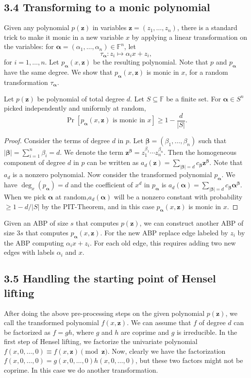 \subsection*{3.4 Transforming to a monic polynomial}
Given any polynomial $p(\mathbf z)$ in variables $\mathbf z=(z_1,\ldots,z_n)$, there is a standard trick to make it monic in a new variable $x$ by applying a linear transformation on the variables: for $\boldsymbol\alpha=(\alpha_1,\ldots,\alpha_n)\in\mathbb F^n$, let
\[\tau_{\boldsymbol\alpha}:z_i\mapsto\alpha_ix+z_i,\]
for $i=1,\ldots,n$. Let $p_{\boldsymbol\alpha}(x,\mathbf z)$ be the resulting polynomial. Note that $p$ and $p_{\boldsymbol\alpha}$ have the same degree. We show that $p_{\boldsymbol\alpha}(x,\mathbf z)$ is monic in $x$, for a random transformation $\tau_{\boldsymbol\alpha}$.
\begin{ntlemma}
Let $p(\mathbf z)$ be polynomial of total degree $d$. Let $S\subseteq\mathbb F$ be a finite set. For $\boldsymbol\alpha\in S^n$ picked independently and uniformly at random,
\[\Pr[p_{\boldsymbol\alpha}(x,\mathbf z)\text{ is monic in }x]\geq1-\frac d{|S|}.\]
\end{ntlemma}
\begin{proof}
Consider the terms of degree $d$ in $p$. Let $\boldsymbol\beta=(\beta_1,\ldots,\beta_n)$ such that $|\boldsymbol\beta|=\sum_{i=1}^n\beta_i=d$. We denote the term $\mathbf z^{\boldsymbol\beta}=z_1^{\beta_1}\cdots z_n^{\beta_n}$. Then the homogeneous component of degree $d$ in $p$ can be written as $a_d(\mathbf z)=\sum_{|\boldsymbol\beta|=d}c_{\boldsymbol\beta}\mathbf z^{\boldsymbol\beta}$. Note that $a_d$ is a nonzero polynomial.
Now consider the transformed polynomial $p_{\boldsymbol\alpha}$. We have $\deg_x(p_{\boldsymbol\alpha})=d$ and the coefficient of $x^d$ in $p_{\boldsymbol\alpha}$ is $a_d(\boldsymbol\alpha)=\sum_{|\boldsymbol\beta|=d}c_{\boldsymbol\beta}\boldsymbol\alpha^{\boldsymbol\beta}$. When we pick $\boldsymbol\alpha$ at random,$a_d(\boldsymbol\alpha)$ will be a nonzero constant with probability $\geq1-d/|S|$ by the PIT-Theorem, and in this case $p_{\boldsymbol\alpha}(x,\mathbf z)$ is monic in $x$.
\end{proof}
Given an ABP of size $s$ that computes $p(\mathbf z)$, we can construct another ABP of size $3s$ that computes $p_{\boldsymbol\alpha}(x,\mathbf z)$. For the new ABP replace edge labeled by $z_i$ by the ABP computing $\alpha_ix+z_i$. For each old edge, this requires adding two new edges with labels $\alpha_i$ and $x$.
\subsection*{3.5 Handling the starting point of Hensel lifting}
After doing the above pre-processing steps on the given polynomial $p(\mathbf z)$, we call the transformed polynomial $f(x,\mathbf z)$. We can assume that $f$ of degree $d$ can be factorized as $f=gh$, where $g$ and $h$ are coprime and $g$ is irreducible. In the first step of Hensel lifting, we factorize the univariate polynomial $f(x,0,\ldots,0)\equiv f(x,\mathbf z)\pmod{\mathbf z}$. Now, clearly we have the factorization $f(x,0,\ldots,0)=g(x,0,\ldots,0)h(x,0,\ldots,0)$, but these two factors might not be coprime. In this case we do another transformation.
